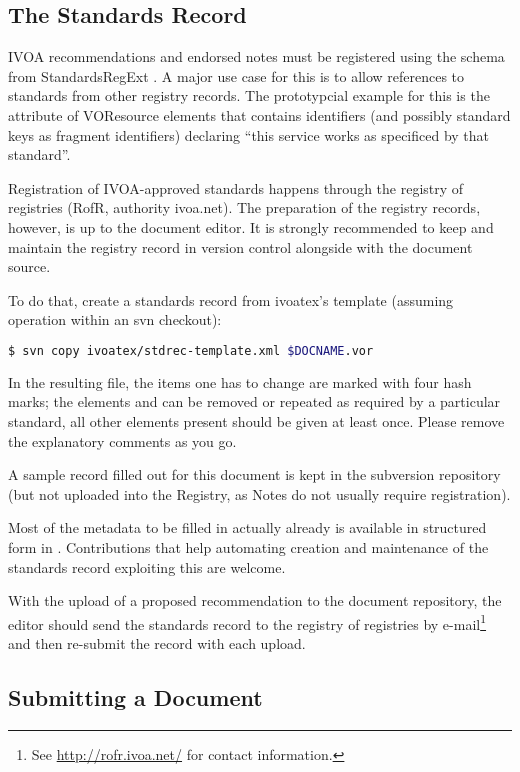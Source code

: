 \documentclass[11pt,a4paper]{ivoa}
\begin{document}
\subsection{The Standards Record}

IVOA recommendations and endorsed notes must be registered using the
schema from StandardsRegExt \citep{2012ivoa.spec.0508H}.  A major use
case for this is to allow references to standards from other registry
records. The prototypcial example for this is the 
attribute of VOResource  elements that contains
identifiers (and possibly standard keys as fragment identifiers)
declaring ``this service works as specificed by that standard''.

Registration of IVOA-approved standards happens through the registry of
registries (RofR, authority ivoa.net).  The preparation of the registry
records, however, is up to the document editor.  It is strongly
recommended to keep and maintain the registry record in version control
alongside with the document source.

To do that, create a standards record from ivoatex's template (assuming
operation within an svn checkout):

\begin{lstlisting}[language=sh]
$ svn copy ivoatex/stdrec-template.xml $DOCNAME.vor
\end{lstlisting}

In the resulting file, the items one has to change are marked with four
hash marks; the elements  and  can be removed
or repeated as required by a particular standard, all other elements
present should be given at least once.  Please remove the explanatory
comments as you go. 

A sample record filled out for this document is kept in the subversion
repository (but not uploaded into the Registry, as Notes do not usually
require registration).

Most of the metadata to be filled in actually already is available in
structured form in \ivoatex.  Contributions that help automating
creation and maintenance of the standards record exploiting this are welcome.

With the upload of a proposed recommendation to the document repository,
the editor should send the standards record to the registry of
registries by e-mail\footnote{See \url{http://rofr.ivoa.net/} for
contact information.} and then re-submit the record with each upload.

\subsection{Submitting a Document}
\end{document}
